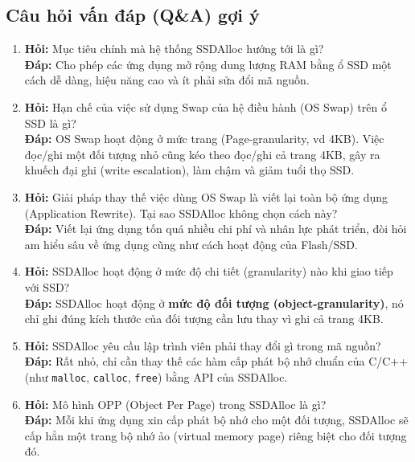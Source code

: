 \documentclass[12pt,a4paper]{article}
\begin{document}
\subsection{Câu hỏi vấn đáp (Q\&A) gợi ý}

\begin{enumerate}
    \item \textbf{Hỏi:} Mục tiêu chính mà hệ thống SSDAlloc hướng tới là gì? \\
    \textbf{Đáp:} Cho phép các ứng dụng mở rộng dung lượng RAM bằng ổ SSD một cách dễ dàng, hiệu năng cao và ít phải sửa đổi mã nguồn.
    
    \item \textbf{Hỏi:} Hạn chế của việc sử dụng Swap của hệ điều hành (OS Swap) trên ổ SSD là gì? \\
    \textbf{Đáp:} OS Swap hoạt động ở mức trang (Page-granularity, vd 4KB). Việc đọc/ghi một đối tượng nhỏ cũng kéo theo đọc/ghi cả trang 4KB, gây ra khuếch đại ghi (write escalation), làm chậm và giảm tuổi thọ SSD.
    
    \item \textbf{Hỏi:} Giải pháp thay thế việc dùng OS Swap là viết lại toàn bộ ứng dụng (Application Rewrite). Tại sao SSDAlloc không chọn cách này? \\
    \textbf{Đáp:} Viết lại ứng dụng tốn quá nhiều chi phí và nhân lực phát triển, đòi hỏi am hiểu sâu về ứng dụng cũng như cách hoạt động của Flash/SSD.
    
    \item \textbf{Hỏi:} SSDAlloc hoạt động ở mức độ chi tiết (granularity) nào khi giao tiếp với SSD? \\
    \textbf{Đáp:} SSDAlloc hoạt động ở \textbf{mức độ đối tượng (object-granularity)}, nó chỉ ghi đúng kích thước của đối tượng cần lưu thay vì ghi cả trang 4KB.
    
    \item \textbf{Hỏi:} SSDAlloc yêu cầu lập trình viên phải thay đổi gì trong mã nguồn? \\
    \textbf{Đáp:} Rất nhỏ, chỉ cần thay thế các hàm cấp phát bộ nhớ chuẩn của C/C++ (như \texttt{malloc}, \texttt{calloc}, \texttt{free}) bằng API của SSDAlloc.
    
    \item \textbf{Hỏi:} Mô hình OPP (Object Per Page) trong SSDAlloc là gì? \\
    \textbf{Đáp:} Mỗi khi ứng dụng xin cấp phát bộ nhớ cho một đối tượng, SSDAlloc sẽ cấp hẳn một trang bộ nhớ ảo (virtual memory page) riêng biệt cho đối tượng đó.
    

\end{enumerate}
\end{document}
